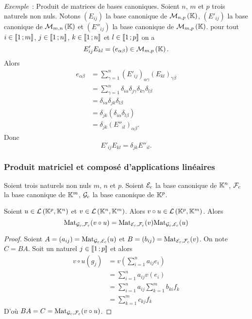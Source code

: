 \emph{Exemple}~: Produit de matrices de bases canoniques. Soient \(n\), \(m\) et 
\(p\) trois naturels non nuls. Notons \((E_{ij})\) la base canonique de 
\(\mathcal{M}_{n,p}\left(\mathbb{K}\right)\), \((E'_{ij})\) la base canonique de \(\mathcal{M}_{m,n}\left(\mathbb{K}\right)\) et 
\((E''_{ij})\) la base canonique de \(\mathcal{M}_{m,p}\left(\mathbb{K}\right)\). pour tout \(i \in 
\mathopen{\llbracket}1\mathclose{}\mathpunct{};m\mathclose{\rrbracket}\), \(j \in \mathopen{\llbracket}1\mathclose{}\mathpunct{};n\mathclose{\rrbracket}\), \(k \in 
\mathopen{\llbracket}1\mathclose{}\mathpunct{};n\mathclose{\rrbracket}\) et \(l \in \mathopen{\llbracket}1\mathclose{}\mathpunct{};p\mathclose{\rrbracket}\) on a
\begin{equation}
  E'_{ij} E_{kl} =(e_{\alpha \beta}) \in \mathcal{M}_{m,p}\left(\mathbb{K}\right).
\end{equation}
Alors
\begin{align}
  e_{\alpha \beta} &=\sum_{\gamma=1}^n (E'_{ij})_{\alpha \gamma} 
  (E_{kl})_{\gamma \beta}\\
  &=\sum_{\gamma=1}^n \delta_{i\alpha} \delta_{j\gamma} \delta_{k\gamma} 
  \delta_{l\beta} \\
  &= \delta_{i\alpha} \delta_{jk} \delta_{l\beta}\\
  &= \delta_{jk} (\delta_{i\alpha} \delta_{l\beta})\\
  &= \delta_{jk} (E''_{il})_{\alpha\beta}.
\end{align}
Donc
\begin{equation}
  E'_{ij} E_{kl} = \delta_{jk} E''_{il}.
\end{equation}

\subsubsection{Produit matriciel et composé d'applications linéaires}

Soient trois naturels non nuls \(m\), \(n\) et \(p\). Soient \(\mathcal{E}_c\) la base 
canonique de \(\mathbb{K}^n\), \(\mathcal{F}_c\) la base canonique de \(\mathbb{K}^m\),  \(\mathcal{G}_c\) la 
base canonique de \(\mathbb{K}^p\).

\begin{prop}
  Soient \(u \in \mathcal{L}\left(\mathbb{K}^p,\mathbb{K}^n\right)\) et \(v \in \mathcal{L}\left(\mathbb{K}^n,\mathbb{K}^m\right)\). Alors \(v 
  \circ u \in \mathcal{L}\left(\mathbb{K}^p,\mathbb{K}^m\right)\). Alors
  \begin{equation}
    \mathrm{Mat}_{\mathcal{G}_c,\mathcal{F}_c}(v \circ u) = \mathrm{Mat}_{\mathcal{E}_c,\mathcal{F}_c}(v) \mathrm{Mat}_{\mathcal{G}_c,\mathcal{E}_c}(u)
  \end{equation}
\end{prop}
\begin{proof}
  Soient \(A= (a_{ij})=\mathrm{Mat}_{\mathcal{G}_c,\mathcal{E}_c}(u)\) et \(B=(b_{ij})= 
  \mathrm{Mat}_{\mathcal{E}_c,\mathcal{F}_c}(v)\). On note \(C=BA\). Soit un naturel \(j \in 
  \mathopen{\llbracket}1\mathclose{}\mathpunct{};p\mathclose{\rrbracket}\) et alors
  \begin{align}
    v \circ u (g_j) &= v\left( \sum_{i=1}^n a_{ij} e_i\right) \\
    &=\sum_{i=1}^n a_{ij} v(e_i) \\
    &=\sum_{i=1}^n a_{ij} \sum_{k=1}^m b_{ki} f_k \\
    &=\sum_{k=1}^m c_{kj} f_k
  \end{align}
  D'où \(BA=C=\mathrm{Mat}_{\mathcal{G}_c,\mathcal{F}_c}(v \circ u)\).
\end{proof}

